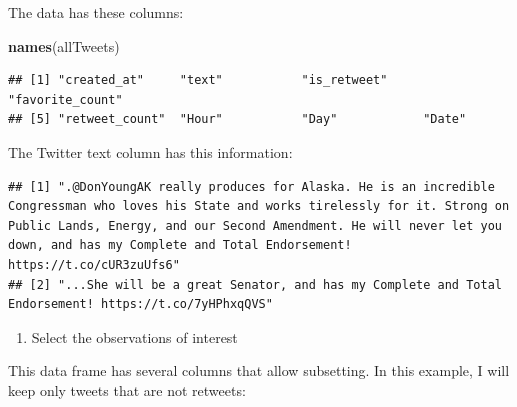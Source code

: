 \documentclass[
]{article}
\newenvironment{Shaded}{\begin{snugshade}}{\end{snugshade}}
\newcommand{\CommentTok}[1]{\textcolor[rgb]{0.56,0.35,0.01}{\textit{#1}}}
\newcommand{\ConstantTok}[1]{\textcolor[rgb]{0.56,0.35,0.01}{#1}}
\newcommand{\DecValTok}[1]{\textcolor[rgb]{0.00,0.00,0.81}{#1}}
\newcommand{\FunctionTok}[1]{\textcolor[rgb]{0.13,0.29,0.53}{\textbf{#1}}}
\newcommand{\NormalTok}[1]{#1}
\newcommand{\OtherTok}[1]{\textcolor[rgb]{0.56,0.35,0.01}{#1}}
\newcommand{\SpecialCharTok}[1]{\textcolor[rgb]{0.81,0.36,0.00}{\textbf{#1}}}
\newcommand{\StringTok}[1]{\textcolor[rgb]{0.31,0.60,0.02}{#1}}
\providecommand{\tightlist}{%
  \setlength{\itemsep}{0pt}\setlength{\parskip}{0pt}}
\begin{document}
The data has these columns:

\begin{Shaded}
\begin{Highlighting}[]
\FunctionTok{names}\NormalTok{(allTweets)}
\end{Highlighting}
\end{Shaded}

\begin{verbatim}
## [1] "created_at"     "text"           "is_retweet"     "favorite_count"
## [5] "retweet_count"  "Hour"           "Day"            "Date"
\end{verbatim}

The Twitter text column has this information:

\begin{Shaded}
\end{Shaded}

\begin{verbatim}
## [1] ".@DonYoungAK really produces for Alaska. He is an incredible Congressman who loves his State and works tirelessly for it. Strong on Public Lands, Energy, and our Second Amendment. He will never let you down, and has my Complete and Total Endorsement! https://t.co/cUR3zuUfs6"
## [2] "...She will be a great Senator, and has my Complete and Total Endorsement! https://t.co/7yHPhxqQVS"
\end{verbatim}

\begin{enumerate}
\def\labelenumi{\arabic{enumi}.}
\setcounter{enumi}{1}
\tightlist
\item
  Select the observations of interest
\end{enumerate}

This data frame has several columns that allow subsetting. In this
example, I will keep only tweets that are not retweets:

\begin{Shaded}
\end{Shaded}
\end{document}
